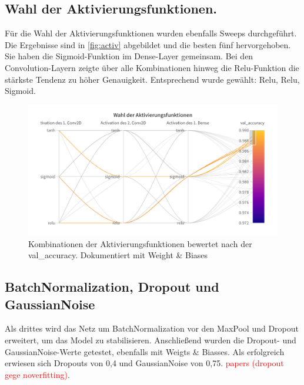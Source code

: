 \documentclass[
fontsize=12pt,					%
paper=a4,						%
twoside=true, 					%
listof=totoc, 					%
bibliography=totoc,				%
titlepage, 						%
headsepline, 					%
DIV=12,							%
BCOR=6mm,						%
cleardoublepage=empty,			%
parskip,							%
ngerman
]{scrartcl}
\begin{document}
\subsection{Wahl der Aktivierungsfunktionen.}

Für die Wahl der Aktivierungsfunktionen wurden ebenfalls Sweeps durchgeführt. Die Ergebnisse sind in \autoref{fig:activ} abgebildet und die besten fünf hervorgehoben. Sie haben die Sigmoid-Funktion im Dense-Layer gemeinsam. Bei den Convolution-Layern zeigte über alle Kombinationen hinweg die Relu-Funktion die stärkste Tendenz zu höher Genauigkeit. Entsprechend wurde gewählt: Relu, Relu, Sigmoid.

\begin{figure}[h]
	\centering
	\includegraphics[width=0.7\linewidth]{images/Activ}
	\caption{Kombinationen der Aktivierungsfunktionen bewertet nach der val\_accuracy. Dokumentiert mit Weight \& Biases}
	\label{fig:activ}
\end{figure}

\subsection{BatchNormalization, Dropout und GaussianNoise}

Als drittes wird das Netz um BatchNormalization vor den MaxPool und Dropout erweitert, um das Model zu stabilisieren. Anschließend wurden die Dropout- und GaussianNoise-Werte getestet, ebenfalls mit Weigts \& Biasses. Als erfolgreich erwiesen sich Dropouts von 0,4 und GaussianNoise von 0,75. \textcolor{red}{papers (dropout gege noverfitting)}.

%	
%	
%	
%	
%	
%	
%	
\end{document}
